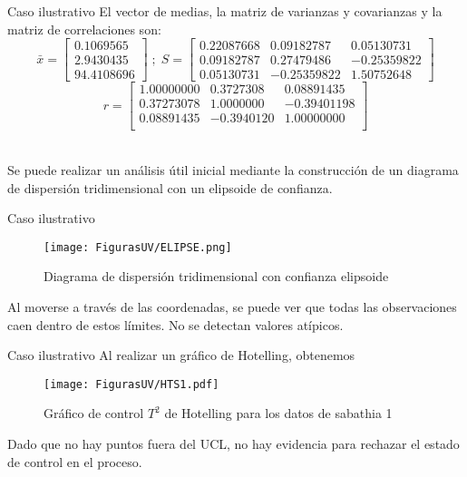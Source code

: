 \documentclass[10pt]{beamer}
\begin{document}
\begin{frame}{Caso ilustrativo}
El vector de medias, la matriz de varianzas y covarianzas y la matriz de correlaciones son:
\begin{equation*} 
\bar{x}=\begin{bmatrix} 
0.1069565   \\ 
 2.9430435  \\
 94.4108696  
\end{bmatrix} \; ; \; 
S=\begin{bmatrix} 
0.22087668 & 0.09182787 & 0.05130731\\
0.09182787 & 0.27479486 &-0.25359822\\
0.05130731 & -0.25359822& 1.50752648
\end{bmatrix}
\end{equation*}
\begin{equation*}
r=\begin{bmatrix}
1.00000000 & 0.3727308 & 0.08891435 \\
0.37273078 & 1.0000000 &-0.39401198 \\
0.08891435 & -0.3940120&  1.00000000 \\
\end{bmatrix}
\end{equation*}

~\\Se puede realizar un análisis útil inicial mediante la construcción de un diagrama de dispersión tridimensional con un elipsoide de confianza.
\end{frame}

\begin{frame}{Caso ilustrativo}
\begin{figure}[h!]
  \centering
  \texttt{[image: FigurasUV/ELIPSE.png]}
  \caption{Diagrama de dispersión tridimensional con confianza elipsoide}
\end{figure}
Al moverse a través de las coordenadas, se puede ver que todas las observaciones caen dentro de estos límites. No se detectan valores atípicos. 
\end{frame}

\begin{frame}{Caso ilustrativo}
Al realizar un gráfico de Hotelling, obtenemos
\begin{figure}[h!]
  \centering
  \texttt{[image: FigurasUV/HTS1.pdf]}
  \caption{Gráfico de control $T^2$ de Hotelling para los datos de sabathia 1}
\end{figure}
Dado que no hay puntos fuera del UCL, no hay evidencia para rechazar el estado de control en el proceso. 
\end{frame}
\end{document}
